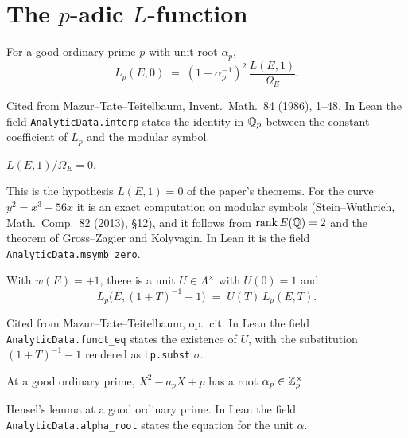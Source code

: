 \section{The $p$-adic $L$-function}

\begin{assumption}
  \label{assum:Interpolation}
  \leanok
  For a good ordinary prime $p$ with unit root $\alpha_p$,
  \[
    L_p(E,0) \;=\; (1 - \alpha_p^{-1})^2\, \frac{L(E,1)}{\Omega_E} .
  \]

  Cited from Mazur--Tate--Teitelbaum, Invent.\ Math.\ 84 (1986), 1--48. In
  Lean the field \texttt{AnalyticData.interp} states the identity in $\mathbb{Q}_p$
  between the constant coefficient of $L_p$ and the modular symbol.
\end{assumption}

\begin{assumption}
  \label{assum:CentralValueZero}
  \leanok
  $L(E,1)/\Omega_E = 0$.

  This is the hypothesis $L(E,1) = 0$ of the paper's theorems. For the curve
  $y^2 = x^3 - 56x$ it is an exact computation on modular symbols (Stein--Wuthrich,
  Math.\ Comp.\ 82 (2013), \S 12), and it follows from
  $\operatorname{rank} E(\mathbb{Q}) = 2$ and the theorem of Gross--Zagier and Kolyvagin. In Lean
  it is the field \texttt{AnalyticData.msymb\_zero}.
\end{assumption}

\begin{assumption}
  \label{assum:FunctionalEquation}
  \leanok
  With $w(E) = +1$, there is a unit $U \in \Lambda^\times$ with $U(0) = 1$
  and
  \[
    L_p\bigl(E, (1+T)^{-1} - 1\bigr) \;=\; U(T)\, L_p(E,T) .
  \]

  Cited from Mazur--Tate--Teitelbaum, op.\ cit. In Lean the field
  \texttt{AnalyticData.funct\_eq} states the existence of $U$, with the
  substitution $(1+T)^{-1} - 1$ rendered as \texttt{Lp.subst} $\sigma$.
\end{assumption}

\begin{assumption}
  \label{assum:UnitRoot}
  \leanok
  At a good ordinary prime, $X^2 - a_pX + p$ has a root
  $\alpha_p \in \mathbb{Z}_p^\times$.

  Hensel's lemma at a good ordinary prime. In Lean the field
  \texttt{AnalyticData.alpha\_root} states the equation for the unit
  $\alpha$.
\end{assumption}

